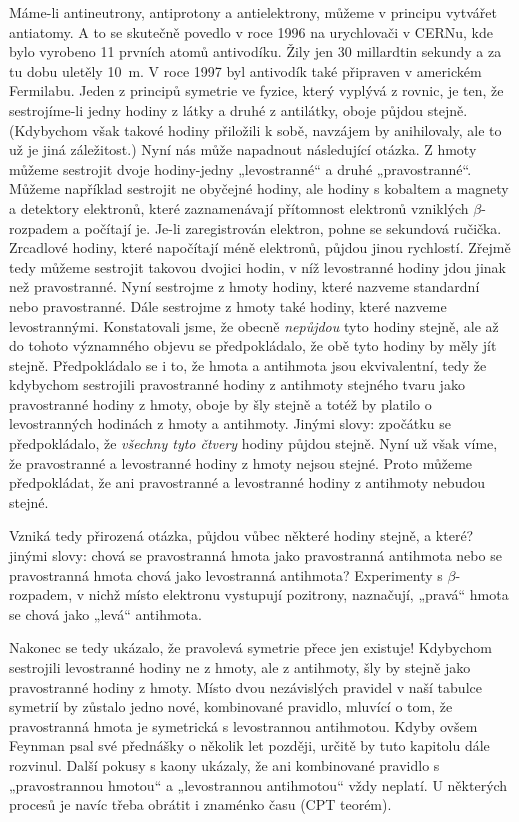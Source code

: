     Máme-li antineutrony, antiprotony a antielektrony, můžeme v principu vytvářet antiatomy.
    A to se skutečně povedlo v roce 1996 na urychlovači v CERNu, kde bylo vyrobeno 11 prvních atomů
    antivodíku. Žily jen 30 millardtin sekundy a za tu dobu uletěly \qty{10}{\m}. V roce 1997 byl
    antivodík také připraven v americkém Fermilabu. Jeden z principů symetrie ve fyzice, který
    vyplývá z rovnic, je ten, že sestrojíme-li jedny hodiny z látky a druhé z antilátky, oboje
    půjdou stejně. (Kdybychom však takové hodiny přiložili k sobě, navzájem by anihilovaly, ale to
    už je jiná záležitost.) Nyní nás může napadnout následující otázka. Z hmoty můžeme sestrojit
    dvoje hodiny-jedny „levostranné“ a druhé „pravostranné“. Můžeme například sestrojit ne obyčejné
    hodiny, ale hodiny s kobaltem a magnety a detektory elektronů, které zaznamenávají přítomnost
    elektronů vzniklých \(\beta\)-rozpadem a počítají je. Je-li zaregistrován elektron, pohne se
    sekundová ručička. Zrcadlové hodiny, které napočítají méně elektronů, půjdou jinou rychlostí.
    Zřejmě tedy můžeme sestrojit takovou dvojici hodin, v níž levostranné hodiny jdou jinak než
    pravostranné. Nyní sestrojme z hmoty hodiny, které nazveme standardní nebo pravostranné. Dále
    sestrojme z hmoty také hodiny, které nazveme levostrannými. Konstatovali jsme, že obecně
    \emph{nepůjdou} tyto hodiny stejně, ale až do tohoto významného objevu se předpokládalo, že obě
    tyto hodiny by měly jít stejně. Předpokládalo se i to, že hmota a antihmota jsou ekvivalentní,
    tedy že kdybychom sestrojili pravostranné hodiny z antihmoty stejného tvaru jako pravostranné
    hodiny z hmoty, oboje by šly stejně a totéž by platilo o levostranných hodinách z hmoty a
    antihmoty. Jinými slovy: zpočátku se předpokládalo, že \emph{všechny tyto čtvery} hodiny půjdou
    stejně. Nyní už však víme, že pravostranné a levostranné hodiny z hmoty nejsou stejné. Proto
    můžeme předpokládat, že ani pravostranné a levostranné hodiny z antihmoty nebudou stejné.

    Vzniká tedy přirozená otázka, půjdou vůbec některé hodiny stejně, a které? jinými slovy: chová
    se pravostranná hmota jako pravostranná antihmota nebo se pravostranná hmota chová jako
    levostranná antihmota? Experimenty s \(\beta\)-rozpadem, v nichž místo elektronu vystupují
    pozitrony, naznačují, „pravá“ hmota se chová jako „levá“ antihmota.

    Nakonec se tedy ukázalo, že pravolevá symetrie přece jen existuje! Kdybychom sestrojili
    levostranné hodiny ne z hmoty, ale z antihmoty, šly by stejně jako pravostranné hodiny z hmoty.
    Místo dvou nezávislých pravidel v naší tabulce symetrií by zůstalo jedno nové, kombinované
    pravidlo, mluvící o tom, že pravostranná hmota je symetrická s levostrannou antihmotou. Kdyby
    ovšem Feynman psal své přednášky o několik let později, určitě by tuto kapitolu dále rozvinul.
    Další pokusy s kaony ukázaly, že ani kombinované pravidlo s „pravostrannou hmotou“ a
    „levostrannou antihmotou“ vždy neplatí. U některých procesů je navíc třeba obrátit i znaménko
    času (CPT teorém). 

